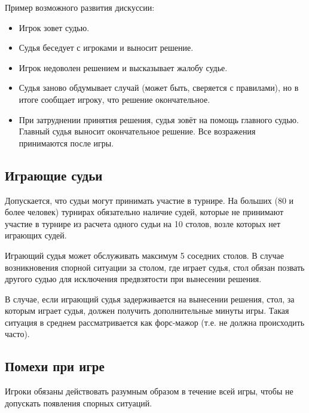 Пример возможного развития дискуссии:
\begin{itemize}
	\item Игрок зовет судью.
	\item Судья беседует с игроками и выносит решение.
	\item Игрок недоволен решением и высказывает жалобу судье.
	\item Судья заново обдумывает случай (может быть, сверяется с правилами), но в итоге сообщает игроку, что решение окончательное.
	\item При затруднении принятия решения, судья зовёт на помощь главного судью. Главный судья выносит окончательное решение. Все возражения принимаются после игры. 
\end{itemize}

\subsection{Играющие судьи}

Допускается, что судьи могут принимать участие в турнире. На больших (80 и более человек) турнирах обязательно наличие судей, которые не принимают участие в турнире из расчета одного судьи на 10 столов, возле которых нет играющих судей.

Играющий судья может обслуживать максимум 5 соседних столов. В случае возникновения спорной ситуации за столом, где играет судья, стол обязан позвать другого судью для исключения предвзятости при вынесении решения. 

В случае, если играющий судья задерживается на вынесении решения, стол, за которым играет судья, должен получить дополнительные минуты игры. Такая ситуация в среднем рассматривается как форс-мажор (т.е. не должна происходить часто).

\subsection{Помехи при игре}

Игроки обязаны действовать разумным образом в течение всей игры, чтобы не допускать появления спорных ситуаций.

